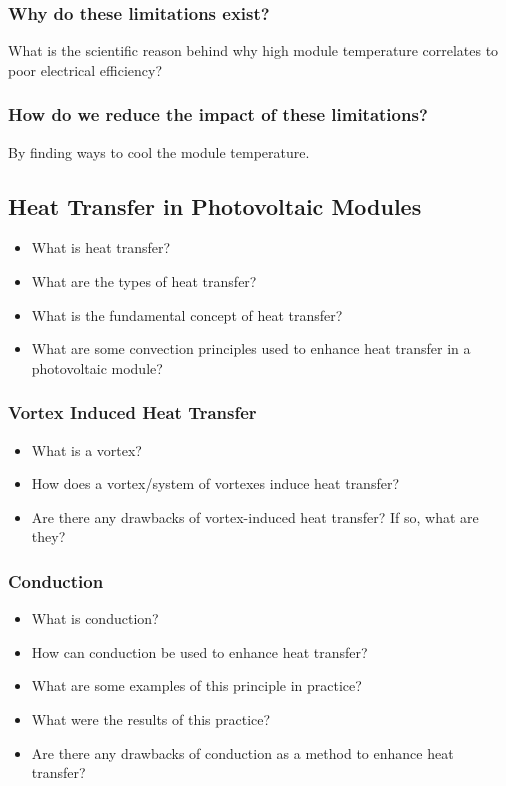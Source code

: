 \subsubsection{Why do these limitations exist?}
What is the scientific reason behind why high module temperature correlates to poor electrical efficiency?\par

\subsubsection{How do we reduce the impact of these limitations?}
By finding ways to cool the module temperature.\par

\subsection{Heat Transfer in Photovoltaic Modules}
\begin{itemize}
    \item What is heat transfer?
    \item What are the types of heat transfer?
    \item What is the fundamental concept of heat transfer?
    \item What are some convection principles used to enhance heat transfer in a photovoltaic module?
\end{itemize}

\subsubsection{Vortex Induced Heat Transfer}
\begin{itemize}
    \item What is a vortex?
    \item How does a vortex/system of vortexes induce heat transfer?
    \item Are there any drawbacks of vortex-induced heat transfer? If so, what are they?
\end{itemize}

\subsubsection{Conduction}
\begin{itemize}
    \item What is conduction?
    \item How can conduction be used to enhance heat transfer?
    \item What are some examples of this principle in practice?
    \item What were the results of this practice?
    \item Are there any drawbacks of conduction as a method to enhance heat transfer?
\end{itemize}

